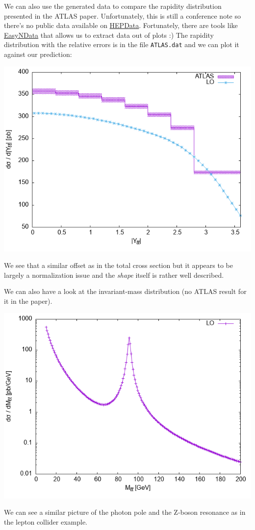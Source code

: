 \documentclass[11pt]{article}
\begin{document}
We can also use the generated data to compare the rapidity distribution presented in the ATLAS paper.
Unfortunately, this is still a conference note so there's no public data available on \href{https://www.hepdata.net/}{HEPData}.
Fortunately, there are tools like \href{https://arxiv.org/abs/0710.2896}{EasyNData} that allows us to extract data out of plots :)
The rapidity distribution with the relative errors is in the file \texttt{ATLAS.dat} and we can plot it against our prediction:
\begin{center}
\includegraphics[width=.9\linewidth]{Yll.png}
\end{center}
We see that a similar offset as in the total cross section but it appears to be largely a normalization issue and the \emph{shape} itself is rather well described.

We can also have a look at the invariant-mass distribution (no ATLAS result for it in the paper).
\begin{center}
\includegraphics[width=.9\linewidth]{Mll.png}
\end{center}
We can see a similar picture of the photon pole and the Z-boson resonance as in the lepton collider example.
\end{document}
